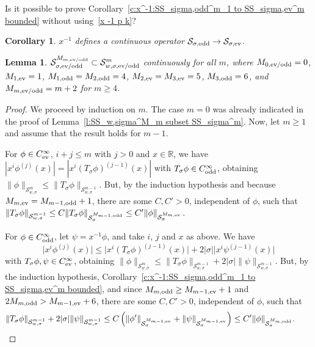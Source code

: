 \documentclass[11pt]{article}
\newtheorem{Corollary}[Theorem]{Corollary}
\newtheorem{Lemma}[Theorem]{Lemma}
\newcommand{\R}{\mathbb{R}}
\renewcommand{\SS}{\mathcal{S}}
\newcommand{\Cinf}{C^\infty}
\begin{document}
\begin{quest}
  Is it possible to prove Corollary~\ref{c:x^-1:SS_sigma,odd^m_1 to SS_sigma,ev^m bounded} without using~\eqref{x -1 p k}?
\end{quest}


\begin{Corollary}\label{c:x^-1 continuous}
  $x^{-1}$ defines a continuous operator $\SS_{\sigma,\text{\rm odd}}\to\SS_{\sigma,\text{\rm ev}}$.
\end{Corollary}

\begin{Lemma}\label{l:SS_sigma^m+2 subset SS_w,sigma^m}
  $\SS_{\sigma,\text{\rm ev/odd}}^{M_{m,\text{\rm ev/odd}}}\subset\SS_{w,\sigma,\text{\rm ev/odd}}^m$ continuously for all $m$, where $M_{0,\text{\rm ev/odd}}=0$, $M_{1,\text{\rm ev}}=1$, $M_{1,\text{\rm odd}}=M_{2,\text{\rm odd}}=4$, $M_{2,\text{\rm ev}}=M_{3,\text{\rm ev}}=5$, $M_{3,\text{\rm odd}}=6$, and $M_{m,\text{\rm ev/odd}}=m+2$ for $m\ge4$.
\end{Lemma}

\begin{proof}
  We proceed by induction on $m$. The case $m=0$ was already indicated in the proof of Lemma~\ref{l:SS_w,sigma^M_m subset SS_sigma^m}. Now, let $m\ge1$ and assume that the result holds for $m-1$.

  For $\phi\in \Cinf_{\text{\rm ev}}$, $i+j\le m$ with $j>0$ and $x\in\R$, we have $|x^i\phi^{(j)}(x)|=|x^i(T_\sigma\phi)^{(j-1)}(x)|$ with $T_\sigma\phi\in \Cinf_{\text{\rm odd}}$, obtaining $\|\phi\|_{\SS_{w,\sigma}^m}\le\|T_\sigma\phi\|_{\SS_{w,\sigma}^{m-1}}$. But, by the induction hypothesis and because $M_{m,\text{\rm ev}}=M_{m-1,\text{\rm odd}}+1$, there are some $C,C'>0$, independent of $\phi$, such that $\|T_\sigma\phi\|_{\SS_{w,\sigma}^{m-1}}\le C \|T_\sigma\phi\|_{\SS_\sigma^{M_{m-1,\text{\rm odd}}}}\le C' \|\phi\|_{\SS_\sigma^{M_{m,\text{\rm ev}}}}$.

  For $\phi\in \Cinf_{\text{\rm odd}}$, let $\psi=x^{-1}\phi$, and take $i$, $j$ and $x$ as above. We have
    \[
      \big|x^i\phi^{(j)}(x)\big|\le\big|x^i(T_\sigma\phi)^{(j-1)}(x)\big|
      +2 |\sigma|\big|x^i\psi^{(j-1)}(x)\big|
    \]
  with $T_\sigma\phi,\psi\in\Cinf_{\text{\rm ev}}$, obtaining $ \|\phi\|_{\SS_{w,\sigma}^m}\le\|T_\sigma\phi\|_{\SS_{w,\sigma}^{m-1}}
      +2 |\sigma| \|\psi\|_{\SS_{w,\sigma}^{m-1}}$. But, by the induction hypothesis, Corollary~\ref{c:x^-1:SS_sigma,odd^m_1 to SS_sigma,ev^m bounded}, and since $M_{m,\text{\rm odd}}\ge M_{m-1,\text{\rm ev}}+1$ and $2M_{m,\text{\rm odd}}>M_{m-1,\text{\rm ev}}+6$, there are some $C,C'>0$, independent of $\phi$, such that
    \begin{gather*}
      \|T_\sigma\phi\|_{\SS_{w,\sigma}^{m-1}}+2 |\sigma| \|\psi\|_{\SS_{w,\sigma}^{m-1}}
      \le C\left(\|\phi'\|_{\SS_\sigma^{M_{m-1,\text{\rm ev}}}}+\|\psi\|_{\SS_\sigma^{M_{m-1,\text{\rm ev}}}}\right)
      \le C' \|\phi\|_{\SS_\sigma^{M_{m,\text{\rm odd}}}} .\tag*{\qed}
    \end{gather*}
\renewcommand{\qed}{}
\end{proof}
\end{document}
